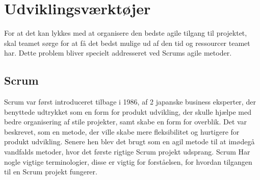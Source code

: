
\chapter{Udviklingsværktøjer}\label{ch:udviklingsværktøjer}

For at det kan lykkes med at organisere den bedste agile tilgang til projektet, skal teamet sørge for at få det bedst mulige ud af den tid og ressourcer teamet har. Dette problem bliver specielt addresseret ved Scrums agile metoder. 

\section{Scrum}


Scrum var først introduceret tilbage i 1986, af 2 japanske business eksperter, der benyttede udtrykket som en form for produkt udvikling, der skulle hjælpe med bedre organisering af stile projekter, samt skabe en form for overblik. Det var beskrevet, som en metode, der ville skabe mere fleksibilitet og hurtigere for produkt udvikling. Senere hen blev det brugt som en agil metode til at imødegå vandfalds metoder, hvor det første rigtige Scrum projekt udsprang. \cite{ScrumHistory}  Scrum Har nogle vigtige terminologier, disse er vigtig for forståelsen, for hvordan tilgangen til en Scrum projekt fungerer. 

